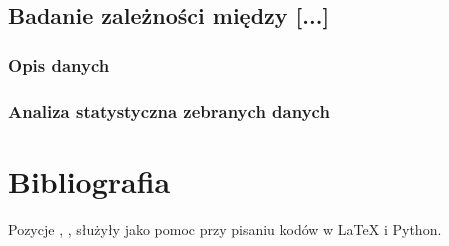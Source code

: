 \documentclass[12pt,a4paper]{article}
\begin{document}
\newpage
\subsection{Badanie zależności między [...]}
\subsubsection{Opis danych}
\subsubsection{Analiza statystyczna zebranych danych}


\newpage


\section{Bibliografia}

Pozycje \cite{gitkkozlowski}, \cite{pandas}, \cite{statsmodels} służyły jako pomoc przy pisaniu kodów w LaTeX i Python.


\end{document}
